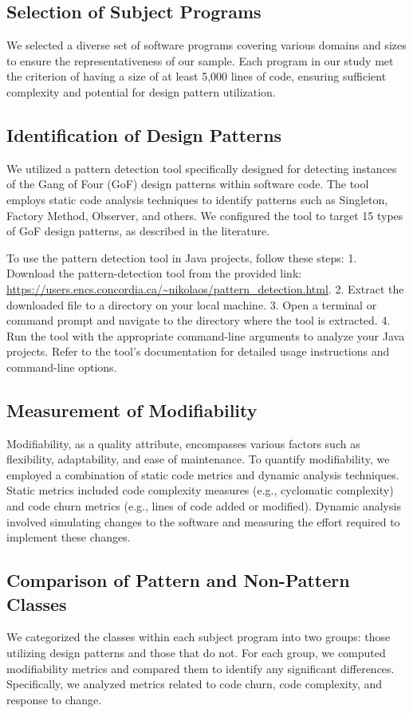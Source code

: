 \documentclass[conference]{IEEEtran}
\begin{document}
	\subsection{Selection of Subject Programs}
	We selected a diverse set of software programs covering various domains and sizes to ensure the representativeness of our sample. Each program in our study met the criterion of having a size of at least 5,000 lines of code, ensuring sufficient complexity and potential for design pattern utilization.
	
	\subsection{Identification of Design Patterns}
	We utilized a pattern detection tool specifically designed for detecting instances of the Gang of Four (GoF) design patterns within software code. The tool employs static code analysis techniques to identify patterns such as Singleton, Factory Method, Observer, and others. We configured the tool to target 15 types of GoF design patterns, as described in the literature.
	
	To use the pattern detection tool in Java projects, follow these steps:
	1. Download the pattern-detection tool from the provided link: \url{https://users.encs.concordia.ca/~nikolaos/pattern_detection.html}.
	2. Extract the downloaded file to a directory on your local machine.
	3. Open a terminal or command prompt and navigate to the directory where the tool is extracted.
	4. Run the tool with the appropriate command-line arguments to analyze your Java projects. Refer to the tool's documentation for detailed usage instructions and command-line options.
	
	\subsection{Measurement of Modifiability}
	Modifiability, as a quality attribute, encompasses various factors such as flexibility, adaptability, and ease of maintenance. To quantify modifiability, we employed a combination of static code metrics and dynamic analysis techniques. Static metrics included code complexity measures (e.g., cyclomatic complexity) and code churn metrics (e.g., lines of code added or modified). Dynamic analysis involved simulating changes to the software and measuring the effort required to implement these changes.
	
	\subsection{Comparison of Pattern and Non-Pattern Classes}
	We categorized the classes within each subject program into two groups: those utilizing design patterns and those that do not. For each group, we computed modifiability metrics and compared them to identify any significant differences. Specifically, we analyzed metrics related to code churn, code complexity, and response to change.
	
\end{document}

